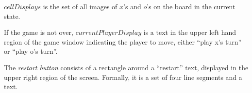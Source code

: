 \documentclass{../lib}
\begin{document}
\begin{ledCmnt}
$cellDisplays$ is the set of all images of $x$'s and $o$'s on the board in the current state.
\end{ledCmnt}

\begin{ledDef}
\end{ledDef}

\begin{ledDef}
\end{ledDef}

\begin{ledCmnt}
If the game is not over, $currentPlayerDisplay$ is a text in the upper left hand region of the game window indicating the player to move, either ``play x's turn'' or ``play o's turn''.
\end{ledCmnt}

\begin{ledDef}
\end{ledDef}

\begin{ledCmnt}
The {\em restart button} consists of a rectangle around a ``restart'' text, displayed in the upper right region of the screen. Formally, it is a set of four line segments and a text.
\end{ledCmnt}

\begin{ledDef}
\end{ledDef}

\begin{ledDef}
\end{ledDef}

\begin{ledDef}
\end{ledDef}

\begin{ledDef}
\end{ledDef}
\end{document}
